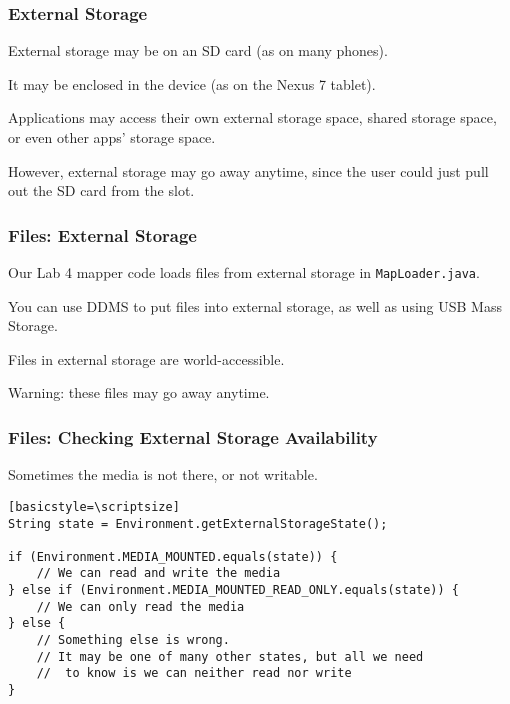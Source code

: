 \begin{frame}
\frametitle{External Storage}
\begin{changemargin}{1cm}

External storage may be on an SD card (as on many phones).

It may be
enclosed in the device (as on the Nexus 7 tablet). 

Applications may access
their own external storage space, shared storage space, or even other
apps' storage space. 

However, external storage may go away anytime, since
the user could just pull out the SD card from the slot.

\end{changemargin}
\end{frame}

\begin{frame}
\frametitle{Files: External Storage}

\begin{changemargin}{1cm}
Our Lab 4 mapper code loads files from external storage in {\tt MapLoader.java}.

You can use DDMS to put files into external storage,
as well as using USB Mass Storage.

Files in external storage are world-accessible.

Warning: these files may go away anytime.
\end{changemargin}
\end{frame}

\begin{frame}[fragile]
\frametitle{Files: Checking External Storage Availability}

\begin{changemargin}{0.1cm}
Sometimes the media is not there, or not writable.
\begin{verbatim}[basicstyle=\scriptsize]
String state = Environment.getExternalStorageState();

if (Environment.MEDIA_MOUNTED.equals(state)) {
    // We can read and write the media
} else if (Environment.MEDIA_MOUNTED_READ_ONLY.equals(state)) {
    // We can only read the media
} else {
    // Something else is wrong. 
    // It may be one of many other states, but all we need
    //  to know is we can neither read nor write
}
\end{verbatim}
\end{changemargin}
\end{frame}

